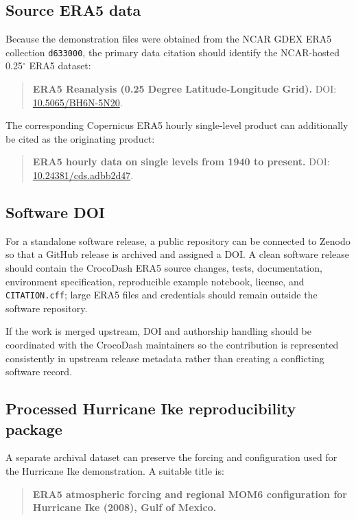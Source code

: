 \documentclass[11pt]{article}
\newcommand{\code}[1]{\texttt{#1}}
\begin{document}
\subsection{Source ERA5 data}

Because the demonstration files were obtained from the NCAR GDEX ERA5 collection \code{d633000}, the primary data citation should identify the NCAR-hosted 0.25$^{\circ}$ ERA5 dataset:

\begin{quote}
\textbf{ERA5 Reanalysis (0.25 Degree Latitude-Longitude Grid).} DOI: \href{https://doi.org/10.5065/BH6N-5N20}{10.5065/BH6N-5N20}.
\end{quote}

The corresponding Copernicus ERA5 hourly single-level product can additionally be cited as the originating product:

\begin{quote}
\textbf{ERA5 hourly data on single levels from 1940 to present.} DOI: \href{https://doi.org/10.24381/cds.adbb2d47}{10.24381/cds.adbb2d47}.
\end{quote}

\subsection{Software DOI}

For a standalone software release, a public repository can be connected to Zenodo so that a GitHub release is archived and assigned a DOI. A clean software release should contain the CrocoDash ERA5 source changes, tests, documentation, environment specification, reproducible example notebook, license, and \code{CITATION.cff}; large ERA5 files and credentials should remain outside the software repository.

If the work is merged upstream, DOI and authorship handling should be coordinated with the CrocoDash maintainers so the contribution is represented consistently in upstream release metadata rather than creating a conflicting software record.

\subsection{Processed Hurricane Ike reproducibility package}

A separate archival dataset can preserve the forcing and configuration used for the Hurricane Ike demonstration. A suitable title is:

\begin{quote}
\textbf{ERA5 atmospheric forcing and regional MOM6 configuration for Hurricane Ike (2008), Gulf of Mexico.}
\end{quote}
\end{document}
